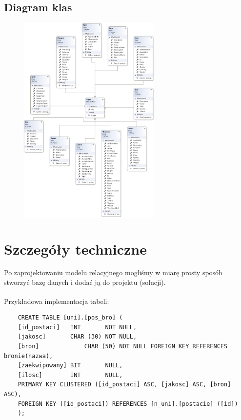 \documentclass{article}
\begin{document}
\subsection*{Diagram klas}
\begin{figure}[h!]
\begin{center}
    
\centering
\includegraphics[height=400px]{Diagram_klas_UML.png}

\end{center}
\end{figure}

\newpage
\section{Szczegóły techniczne}
Po zaprojektowaniu modelu relacyjnego mogliśmy w miarę prosty sposób stworzyć bazę danych i dodać ją do projektu (solucji).
\\\\Przykładowa implementacja tabeli:
\begin{verbatim}
    CREATE TABLE [uni].[pos_bro] (
    [id_postaci]   INT       NOT NULL,
    [jakosc]       CHAR (30) NOT NULL,
    [bron]	    	   CHAR (50) NOT NULL FOREIGN KEY REFERENCES bronie(nazwa),
    [zaekwipowany] BIT       NULL,
    [ilosc]        INT       NULL,
    PRIMARY KEY CLUSTERED ([id_postaci] ASC, [jakosc] ASC, [bron] ASC),
    FOREIGN KEY ([id_postaci]) REFERENCES [n_uni].[postacie] ([id])
    );

\end{verbatim}
\end{document}
